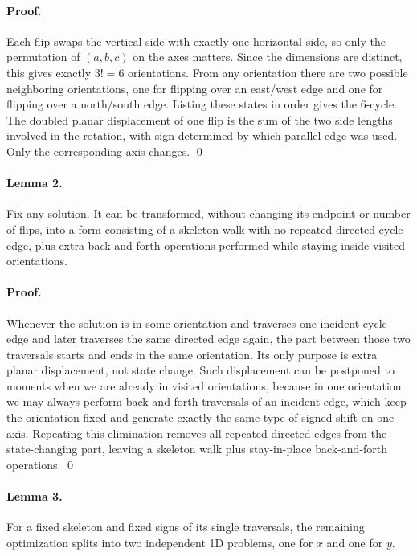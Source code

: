 \documentclass[11pt]{article}
\begin{document}
\paragraph{Proof.}
Each flip swaps the vertical side with exactly one horizontal side, so only the permutation of $(a,b,c)$ on the axes matters. Since the dimensions are distinct, this gives exactly $3!=6$ orientations. From any orientation there are two possible neighboring orientations, one for flipping over an east/west edge and one for flipping over a north/south edge. Listing these states in order gives the 6-cycle. The doubled planar displacement of one flip is the sum of the two side lengths involved in the rotation, with sign determined by which parallel edge was used. Only the corresponding axis changes. \qed

\paragraph{Lemma 2.}
Fix any solution. It can be transformed, without changing its endpoint or number of flips, into a form consisting of a skeleton walk with no repeated directed cycle edge, plus extra back-and-forth operations performed while staying inside visited orientations.

\paragraph{Proof.}
Whenever the solution is in some orientation and traverses one incident cycle edge and later traverses the same directed edge again, the part between those two traversals starts and ends in the same orientation. Its only purpose is extra planar displacement, not state change. Such displacement can be postponed to moments when we are already in visited orientations, because in one orientation we may always perform back-and-forth traversals of an incident edge, which keep the orientation fixed and generate exactly the same type of signed shift on one axis. Repeating this elimination removes all repeated directed edges from the state-changing part, leaving a skeleton walk plus stay-in-place back-and-forth operations. \qed

\paragraph{Lemma 3.}
For a fixed skeleton and fixed signs of its single traversals, the remaining optimization splits into two independent 1D problems, one for $x$ and one for $y$.
\end{document}
